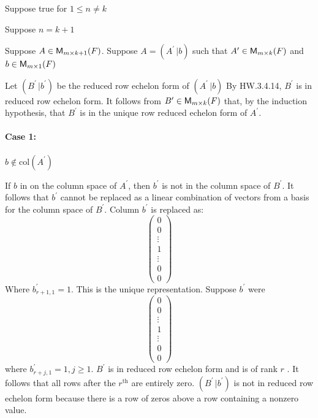 Suppose true for $1\leq n \neq k$

Suppose $n = k+1$

Suppose $A \in \mathsf{M}_{m \times k+1}(F)$. Suppose $A = (A^\prime\,|b)$ such that
$A^\prime \in \mathsf{M}_{m \times k}(F)$ and $ b \in \mathsf{M}_{m \times 1}(F)$

Let $(B^\prime\,|b^\prime)$ be the reduced row echelon form of
$(A^\prime\,|b)$ By HW.3.4.14, $B^\prime$ is in reduced row echelon
form. It follows from $B^\prime \in \mathsf{M}_{m \times k}(F)$ that, by the
induction hypothesis, that $B^\prime$ is in the unique row reduced
echelon form of $A^\prime$.
\paragraph{Case 1:} $b \notin \text{col}(A^\prime)$

If $b$ in on the column space of $A^\prime$, then $b^\prime$ is not in
the column space of $B^\prime$. It follows that $b^\prime$ cannot be
replaced as a linear combination of vectors from a basis for the
column space of $B^\prime$. Column $b^\prime$ is replaced as:
\begin{equation}
\begin{pmatrix}
0\\0\\\vdots\\1\\\vdots\\0\\0
\end{pmatrix}
\end{equation}
Where $b^\prime_{r+1,1}=1$. This is the unique representation. Suppose
$b^\prime$ were
\begin{equation}
\begin{pmatrix}
0\\0\\\vdots\\1\\\vdots\\0\\0
\end{pmatrix}
\end{equation}
where $b^\prime_{r+j,1}=1, j\geq 1$. $B^\prime$ is in reduced row
echelon form and is of rank $r$ . It follows that all rows after the
$r^{\text{th}}$ are entirely zero. $(B^\prime\,|b^\prime)$ is not in
reduced row echelon form because there is a row of zeros above a row
containing a nonzero value.
